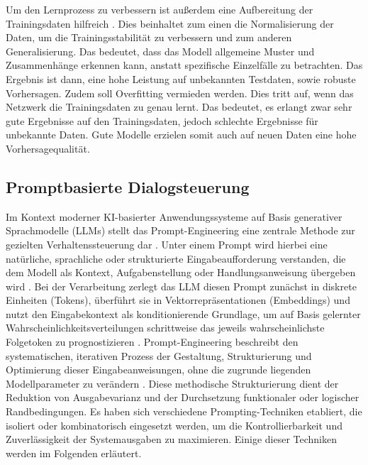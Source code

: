 Um den Lernprozess zu verbessern ist außerdem eine Aufbereitung der Trainingsdaten hilfreich \citep{nielsen2015neural}. Dies beinhaltet zum einen die Normalisierung der Daten, um die Trainingsstabilität zu verbessern und zum anderen Generalisierung. Das bedeutet, dass das Modell allgemeine Muster und Zusammenhänge erkennen kann, anstatt spezifische Einzelfälle zu betrachten. Das Ergebnis ist dann, eine hohe Leistung auf unbekannten Testdaten, sowie robuste Vorhersagen. Zudem soll Overfitting vermieden werden. Dies tritt auf, wenn das Netzwerk die Trainingsdaten zu genau lernt. Das bedeutet, es erlangt zwar sehr gute Ergebnisse auf den Trainingsdaten, jedoch schlechte Ergebnisse für unbekannte Daten. Gute Modelle erzielen somit auch auf neuen Daten eine hohe Vorhersagequalität. 


\subsection{Promptbasierte Dialogsteuerung}
Im Kontext moderner KI-basierter Anwendungssysteme auf Basis generativer Sprachmodelle (LLMs) stellt das Prompt-Engineering eine zentrale Methode zur gezielten Verhaltenssteuerung dar \citep{crocker2025softwareentwicklung}. Unter einem Prompt wird hierbei eine natürliche, sprachliche oder strukturierte Eingabeaufforderung verstanden, die dem Modell als Kontext, Aufgabenstellung oder Handlungsanweisung übergeben wird \citep{liu2023pre}. Bei der Verarbeitung zerlegt das LLM diesen Prompt zunächst in diskrete Einheiten (Tokens), überführt sie in Vektorrepräsentationen (Embeddings) und nutzt den Eingabekontext als konditionierende Grundlage, um auf Basis gelernter Wahrscheinlichkeitsverteilungen schrittweise das jeweils wahrscheinlichste Folgetoken zu prognostizieren \citep{brown2020language}. Prompt-Engineering beschreibt den systematischen, iterativen Prozess der Gestaltung, Strukturierung und Optimierung dieser Eingabeanweisungen, ohne die zugrunde liegenden Modellparameter zu verändern \citep{liu2023pre}. Diese methodische Strukturierung dient der Reduktion von Ausgabevarianz und der Durchsetzung funktionaler oder logischer Randbedingungen. Es haben sich verschiedene Prompting-Techniken etabliert, die isoliert oder kombinatorisch eingesetzt werden, um die Kontrollierbarkeit und Zuverlässigkeit der Systemausgaben zu maximieren. Einige dieser Techniken werden im Folgenden erläutert.

